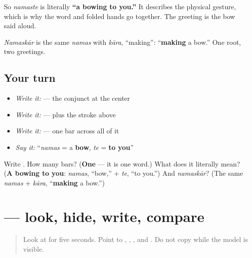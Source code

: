 So \emph{namaste} is literally \textbf{\textquotedblleft{}a bowing to you.\textquotedblright{}} It describes the physical gesture, which is why the word and folded hands go together. The greeting is the bow said aloud.

\emph{Namaskār} is the same \emph{namas} with \emph{kāra}, \textquotedblleft{}making\textquotedblright{}: \textquotedblleft{}\textbf{making} a bow.\textquotedblright{} One root, two greetings.

\subsection*{Your turn}
\begin{itemize}
\raggedright
  \item \emph{Write it:}  — the conjunct at the center
  \item \emph{Write it:}  —  plus the stroke above
  \item \emph{Write it:} \textbf{} — one bar across all of it
  \item \emph{Say it:} \textquotedblleft{}\emph{namas} = a \textbf{bow}, \emph{te} = \textbf{to you}\textquotedblright{}
\end{itemize}

\begin{tcolorbox}[breakable,colback=teal!4,colframe=teal!35!black,title={Before you move on}]
Write \textbf{}. How many bars? (\textbf{One} — it is one word.) What does it literally mean? (\textbf{A bowing to you}: \emph{namas}, \textquotedblleft{}bow,\textquotedblright{} + \emph{te}, \textquotedblleft{}to you.\textquotedblright{}) And \emph{namaskār}? (The same \emph{namas} + \emph{kāra}, \textquotedblleft{}\textbf{making} a bow.\textquotedblright{})
\end{tcolorbox}
\section[\texorpdfstring{\hi{नमस्ते} (namaste)}{नमस्ते (namaste)}]{ — look, hide, write, compare}

\label{lesson:HI-W05-namaste-delayed-copy}



\begin{quote}
Look at \textbf{} for five seconds. Point to \textbf{}, \textbf{}, \textbf{}, and \textbf{}. Do not copy while the model is visible.
\end{quote}

